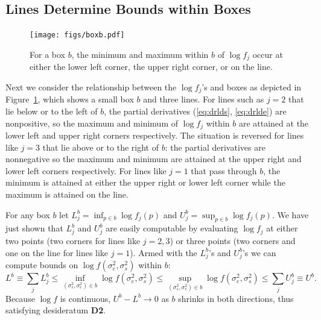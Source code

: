 \documentclass{report}
\newcommand{\RL}{f}
\newcommand{\logRL}{\log\RL}
\newcommand{\sigssq}{\sigma_s^2}
\newcommand{\sigesq}{\sigma_e^2}
\newcommand{\logRLss}{\logRL(\sigesq,\sigssq)}
\begin{document}
\subsection{Lines Determine Bounds within Boxes}
\label{sec:boundsinboxes}
\begin{figure}
	\centering
	\texttt{[image: figs/boxb.pdf]}
	\caption{For a box $b$,  the minimum and
	maximum within $b$ of $\logRL_j$
	occur at either the lower left corner, the upper right  corner, or
	on the line.
}	\label{fig:boxb}
\end{figure}
Next we consider the relationship between the $\logRL_j$'s and boxes as depicted in Figure~\ref{fig:boxb}, which shows a small box $b$ and three lines.  For lines such as $j=2$ that lie below or to the left of $b$, the partial derivatives (\ref{eq:drlds}, \ref{eq:drlde}) are nonpositive, so the maximum and minimum of $\logRL_j$ within $b$ are attained at the lower left and upper right corners respectively.  The situation is reversed for lines like $j=3$ that lie above or to the right of $b$: the partial derivatives are nonnegative so the maximum and minimum are attained at the upper right and lower left corners respectively.  For lines like $j=1$ that pass through $b$, the minimum is attained at either the upper right or lower left corner while the maximum is attained on the line.

For any box $b$ let $L^b_j = \inf_{p\in b} \logRL_j(p)$ and $U^b_j = \sup_{p\in b} \logRL_j(p)$.  We have just shown that $L^b_j$ and $U^b_j$ are easily computable by evaluating $\logRL_j$ at either two points (two corners for lines like $j=2,3$) or three points (two corners and one on the line for lines like $j=1$).
Armed with the $L^b_j$'s and $U^b_j$'s we can compute bounds on $\logRLss$ within $b$:
\begin{equation}
\label{eq:bounds}
	L^b \equiv \sum_j L^b_j \le \inf_{(\sigssq,\sigesq)\in b} \logRLss \le
	\sup_{(\sigssq,\sigesq)\in b} \logRLss \le \sum_j U^b_j \equiv U^b.
\end{equation}
Because $\logRL$ is continuous, $U^b - L^b \rightarrow 0$ as $b$ shrinks in both directions, thus satisfying desideratum \textbf{D2}.
\end{document}
